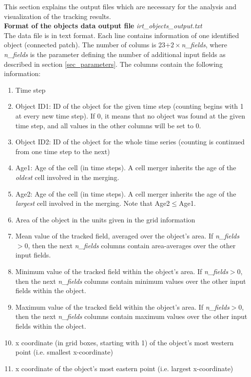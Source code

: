 \documentclass[11pt]{article}
\begin{document}
This section explains the output files which are necessary for the analysis and visualization of the tracking results.\vspace{0.5cm}\\
{\bf Format of the objects data output file} {\it irt\_objects\_output.txt}\\
The data file is in text format. Each line contains information of one identified object (connected patch). The number of colums is 23$+2\times${\it n\_fields}, where {\it n\_fields} is the parameter defining the number of additional input fields as described in section \ref{sec_parameters}. The columns contain the following information:
\begin{enumerate}
\item Time step
\item Object ID1: ID of the object for the given time step (counting begins with 1 at every new time step). If 0, it means that no object was found at the given time step, and all values in the other columns will be set to 0.
\item Object ID2: ID of the object for the whole time series (counting is continued from one time step to the next)
\item Age1: Age of the cell (in time steps). A cell merger inherits the age of the {\it oldest} cell involved in the merging.
\item Age2: Age of the cell (in time steps). A cell merger inherits the age of the {\it largest} cell involved in the merging. Note that Age2$\le$Age1.
\item Area of the object in the units given in the grid information
\item Mean value of the tracked field, averaged over the object's area. If {\it n\_fields}$>0$, then the next {\it n\_fields} columns contain area-averages over the other input fields.
\item Minimum value of the tracked field within the object's area. If {\it n\_fields}$>0$, then the next {\it n\_fields} columns contain minimum values over the other input fields within the object.
\item Maximum value of the tracked field within the object's area. If {\it n\_fields}$>0$, then the next {\it n\_fields} columns contain maximum values over the other input fields within the object.
\item x coordinate (in grid boxes, starting with 1) of the object's most western point (i.e. smallest x-coordinate)
\item x coordinate of the object's most eastern point (i.e. largest x-coordinate)

\end{enumerate}
\end{document}
